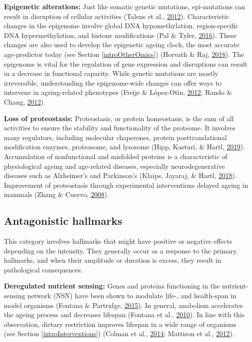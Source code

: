 \documentclass[12pt,twoside]{unicam}
\begin{document}
\textbf{Epigenetic alterations:} Just like somatic genetic mutations, epi-mutations can result in disruption of cellular activities (Talens et al., \protect\hyperlink{ref-Talens2012}{2012}). Characteristic changes in the epigenome involve global DNA hypomethylation, region-specific DNA hypermethylation, and histone modifications (Pal \& Tyler, \protect\hyperlink{ref-Pal2016}{2016}). These changes are also used to develop the epigenetic ageing clock, the most accurate age-predictor today (see Section \ref{introOtherOmics}) (Horvath \& Raj, \protect\hyperlink{ref-Horvath2018}{2018}). The epigenome is vital for the regulation of gene expression and disruptions can result in a decrease in functional capacity. While genetic mutations are mostly irreversible, understanding the epigenome-wide changes can offer ways to intervene in ageing-related phenotypes (Freije \& López-Otı́n, \protect\hyperlink{ref-Freije2012}{2012}; Rando \& Chang, \protect\hyperlink{ref-Rando2012}{2012}).

\textbf{Loss of proteostasis:} Proteostasis, or protein homeostasis, is the sum of all activities to ensure the stability and functionality of the proteome. It involves many regulators, including molecular chaperones, protein posttranslational modification enzymes, proteasome, and lysosome (Hipp, Kasturi, \& Hartl, \protect\hyperlink{ref-Hipp2019}{2019}). Accumulation of nonfunctional and misfolded proteins is a characteristic of physiological ageing and age-related diseases, especially neurodegenerative diseases such as Alzheimer's and Parkinson's (Klaips, Jayaraj, \& Hartl, \protect\hyperlink{ref-Klaips2018}{2018}). Improvement of proteostasis through experimental interventions delayed ageing in mammals (Zhang \& Cuervo, \protect\hyperlink{ref-Zhang2008}{2008}).

\hypertarget{antagonistic-hallmarks}{%
\subsection{Antagonistic hallmarks}\label{antagonistic-hallmarks}}

This category involves hallmarks that might have positive or negative effects depending on the intensity. They generally occur as a response to the primary hallmarks, and when their amplitude or duration is excess, they result in pathological consequences.

\textbf{Deregulated nutrient sensing:} Genes and proteins functioning in the nutrient-sensing network (NSN) have been shown to modulate life-, and health-span in model organisms (Fontana \& Partridge, \protect\hyperlink{ref-Fontana2015}{2015}). In general, anabolism accelerates the ageing process and decreases lifespan (Fontana et al., \protect\hyperlink{ref-Fontana2010}{2010}). In line with this observation, dietary restriction improves lifespan in a wide range of organisms (see Section \ref{introInterventions}) (Colman et al., \protect\hyperlink{ref-Colman2014}{2014}; Mattison et al., \protect\hyperlink{ref-Mattison2012}{2012}).
\end{document}
